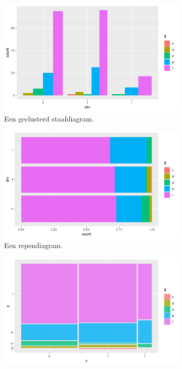 \begin{figure}
  \begin{subfigure}{.33\textwidth}
    \centering
    \includegraphics[width=\textwidth]{img/bivar-geclusterd-staafdiagram}
    \caption{Een geclusterd staafdiagram.}
    \label{fig:geclusterd-staafdiagram}
  \end{subfigure}
  \begin{subfigure}{.33\textwidth}
    \centering
    \includegraphics[width=\textwidth]{img/bivar-rependiagram}
    \caption{Een rependiagram.}
    \label{fig:rependiagram}
  \end{subfigure}
  \begin{subfigure}{.33\textwidth}
    \centering
    \includegraphics[width=\textwidth]{img/bivar-mozaiekdiagram}

\end{subfigure}
\end{figure}
